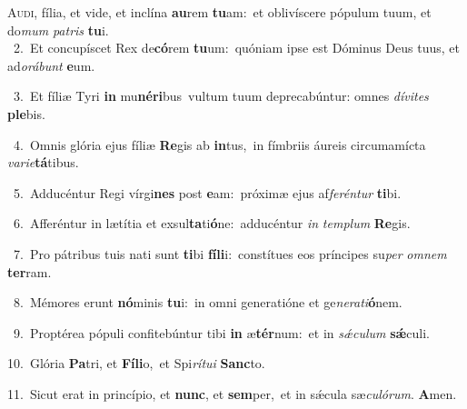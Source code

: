 \lettrine{\initial\textcolor{\initialcolor}{A}}{udi,} fília, et vide, et inclína \textbf{au}\-rem \textbf{tu}\-am:~\star et oblivíscere pópulum tuum, et do\textit{mum} \textit{pa}\-\textit{tris} \textbf{tu}\-i.\\
{\numbfont\textcolor{\numbcolor}{~2.}}~Et concupíscet Rex de\-\textbf{có}\-rem \textbf{tu}\-um:~\star quóniam ipse est Dóminus Deus tuus, et ad\-\textit{o}\-\textit{rá}\textit{bunt} \textbf{e}\-um.\par
{\numbfont\textcolor{\numbcolor}{~3.}}~Et fíliæ Tyri \textbf{in} mu\-\textbf{né}\-\textbf{ri}bus~\star vultum tuum deprecabúntur: omnes \textit{dí}\-\textit{vi}\textit{tes} \textbf{ple}\-bis.\par
{\numbfont\textcolor{\numbcolor}{~4.}}~Omnis glória ejus fíliæ \textbf{Re}\-gis ab \textbf{in}\-tus,~\star in fímbriis áureis circumamícta \textit{va}\-\textit{ri}\textit{e}\textbf{tá}tibus.\par
{\numbfont\textcolor{\numbcolor}{~5.}}~Adducéntur Regi vírgi\textbf{nes} post \textbf{e}\-am:~\star próximæ ejus af\-\textit{fe}\-\textit{rén}\textit{tur} \textbf{ti}\-bi.\par
{\numbfont\textcolor{\numbcolor}{~6.}}~Afferéntur in lætítia et exsul\-\textbf{ta}\-ti\-\textbf{ó}\-ne:~\star adducéntur \textit{in} \textit{tem}\-\textit{plum} \textbf{Re}\-gis.\par
{\numbfont\textcolor{\numbcolor}{~7.}}~Pro pátribus tuis nati sunt \textbf{ti}\-bi \textbf{fí}\-\textbf{li}i:~\star constítues eos príncipes su\textit{per} \textit{om}\-\textit{nem} \textbf{ter}\-ram.\par
{\numbfont\textcolor{\numbcolor}{~8.}}~Mémores erunt \textbf{nó}\-minis \textbf{tu}\-i:~\star in omni generatióne et ge\-\textit{ne}\-\textit{ra}\textit{ti}\textbf{ó}nem.\par
{\numbfont\textcolor{\numbcolor}{~9.}}~Proptérea pópuli confitebúntur tibi \textbf{in} æ\-\textbf{tér}\-num:~\star et in \textit{sǽ}\-\textit{cu}\textit{lum} \textbf{sǽ}\-culi.\par
{\numbfont\textcolor{\numbcolor}{10.}}~Glória \textbf{Pa}\-tri, et \textbf{Fí}\-\textbf{li}o,~\star et Spi\-\textit{rí}\-\textit{tu}\textit{i} \textbf{Sanc}\-to.\par
{\numbfont\textcolor{\numbcolor}{11.}}~Sicut erat in princípio, et \textbf{nunc}\-, et \textbf{sem}\-per,~\star et in sǽcula sæ\-\textit{cu}\-\textit{ló}\textit{rum}. \textbf{A}\-men.\par
